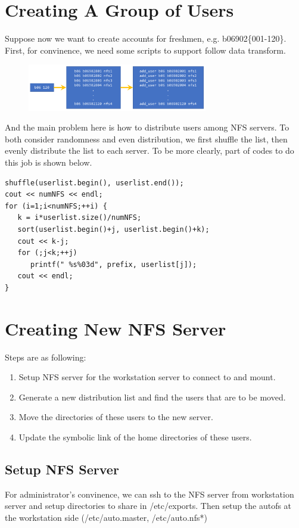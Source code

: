 \documentclass{article}
\begin{document}
\section{Creating A Group of Users}
Suppose now we want to create accounts for freshmen, e.g. b06902\{001-120\}. First, for convinence, we need some scripts to support
follow data transform.
\begin{figure}[H]
\centering
\includegraphics[width=0.7\textwidth]{Fig2.png}
\end{figure}
And the main problem here is how to distribute users among NFS servers. To both consider randomness and even distribution,
we first shuffle the list, then evenly distribute the list to each server. To be more clearly, 
part of codes to do this job is shown below.
\begin{framed}
\begin{verbatim}
shuffle(userlist.begin(), userlist.end());
cout << numNFS << endl;
for (i=1;i<numNFS;++i) {
   k = i*userlist.size()/numNFS;
   sort(userlist.begin()+j, userlist.begin()+k);
   cout << k-j;
   for (;j<k;++j)
      printf(" %s%03d", prefix, userlist[j]);
   cout << endl;
}
\end{verbatim}
\end{framed}
\section{Creating New NFS Server}
Steps are as following:
   \begin{enumerate}
   \item Setup NFS server for the workstation server to connect to and mount.
   \item Generate a new distribution list and find the users that are to be moved.
   \item Move the directories of these users to the new server.
   \item Update the symbolic link of the home directories of these users.
   \end{enumerate}
\subsection{Setup NFS Server}
For administrator's convinence, we can {\cs ssh} to the NFS server from workstation server and setup directories to share in
{\cs /etc/exports}. Then setup the autofs at the workstation side ({\cs /etc/auto.master, /etc/auto.nfs*})
\end{document}
